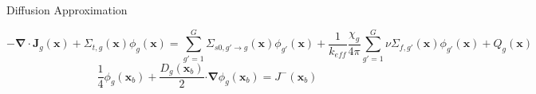 
\begin{frame}[t]{Diffusion Approximation}
  
    \begin{dmath*}\label{e:DiffusionEquation}
        {-\bm\nabla \cdot \bm J_g\left(\bm 
        x\right) + \Sigma_{t,g}\left(\bm x\right)\phi_g\left(\bm x\right) = 
        \sum_{g'=1}^G \Sigma_{s0,g'\rightarrow g}\left(\bm 
        x\right)\phi_{g'}\left(\bm x\right)} + 
        {\frac{1}{k_{eff}}\frac{\chi_g}{4\pi} \sum_{g'=1}^G 
        \nu\Sigma_{f,g'}\left(\bm x\right)\phi_{g'}\left(\bm x\right)} + 
        Q_g\left(\bm x\right)
    \end{dmath*}
    \begin{equation*}\label{e:DiffusionEquationBC}
    \frac{1}{4} \phi_g\left(\bm x_b\right) + \frac{D_g\left(\bm x_b\right)}{2} 
    \bm \cdot \bm \nabla \phi_g\left(\bm x_b\right) = J^-\left(\bm x_b\right)
    \end{equation*}
    
\end{frame}